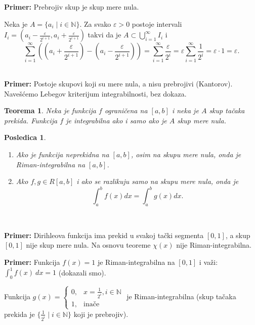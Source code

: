 \documentclass[a4paper,12pt,twoside]{report}
\newtheorem{theorem}{Teorema}[section]
\newtheorem{corollary}{Posledica}[theorem]
\numberwithin{algorithm}{section}
\begin{document}
\noindent\textbf{Primer:} Prebrojiv skup je skup mere nula.

Neka je \(A = \{a_i \mid i \in \mathbb{N}\}\). Za svako \(\varepsilon > 0\) postoje intervali \(I_i = (a_i - \frac{\varepsilon}{2^{i+1}}, a_i + \frac{\varepsilon}{2^{i+1}})\) takvi da je \(A \subset \bigcup_{i=1}^\infty I_i\) i \[\sum_{i=1}^\infty \left( \left(a_i + \frac{\varepsilon}{2^{i+1}}\right) - \left(a_i - \frac{\varepsilon}{2^{i+1}}\right) \right) = \sum_{i=1}^\infty \frac{\varepsilon}{2^i} = \varepsilon \sum_{i=1}^\infty \frac{1}{2^i} = \varepsilon \cdot 1 = \varepsilon.\]
\\
\medskip

\noindent\textbf{Primer:} Postoje skupovi koji su mere nula, a nisu prebrojivi (Kantorov). Navešćemo Lebegov kriterijum integrabilnosti, bez dokaza.

\begin{theorem}
    Neka je funkcija \(f\) ograničena na \([a, b]\) i neka je \(A\) skup tačaka prekida. Funkcija \(f\) je integrabilna ako i samo ako je \(A\) skup mere nula.
\end{theorem}

\begin{corollary}\
    \begin{enumerate}[label=\alph*)]
        \item Ako je funkcija neprekidna na \([a, b]\), osim na skupu mere nula, onda je Riman-integrabilna na \([a, b]\).
        \item Ako \(f, g \in R[a, b]\) i ako se razlikuju samo na skupu mere nula, onda je \[\int_a^b f(x) dx = \int_a^b g(x) dx.\]
    \end{enumerate}
\end{corollary}

\
\medskip

\noindent\textbf{Primer:} Dirihleova funkcija ima prekid u svakoj tački segmenta \([0, 1]\), a skup \([0, 1]\) nije skup mere nula. Na osnovu teoreme \(\chi(x)\) nije Riman-integrabilna.

\newpage

\noindent\textbf{Primer:} Funkcija \(f(x) = 1\) je Riman-integrabilna na \([0, 1]\) i važi: \(\int_0^1 f(x) \ dx = 1\) (dokazali smo).

Funkcija \(g(x) = \begin{cases} 0, & x = \frac{1}{2^i}, i \in \mathbb{N} \\ 1, & \text{inače} \end{cases}\) je Riman-integrabilna (skup tačaka prekida je \(\{\frac{1}{2^i} \mid i \in \mathbb{N}\}\) koji je prebrojiv).
\end{document}
